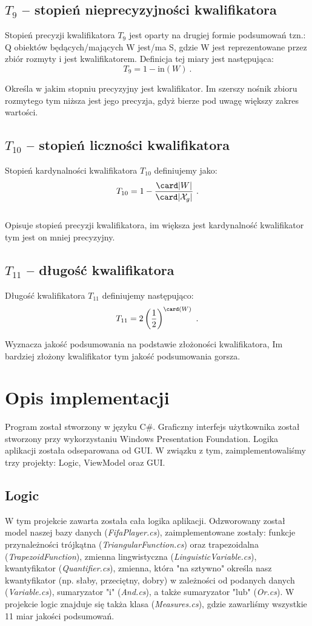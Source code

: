 \documentclass{classrep}
\begin{document}
\subsection{\(T_9\) -- stopień nieprecyzyjności kwalifikatora}
Stopień precyzji kwalifikatora \(T_9\) jest oparty na drugiej formie podsumowań tzn.: Q obiektów będących/mających W jest/ma S, gdzie W jest reprezentowane przez zbiór rozmyty i jest kwalifikatorem. Definicja tej miary jest następująca:
\[T_9 = 1-\mathrm{in}(W) ~\mbox{.}\]

Określa w jakim stopniu precyzyjny jest kwalifikator. Im szerszy nośnik zbioru rozmytego tym niższa jest jego precyzja, gdyż bierze pod uwagę większy zakres wartości. 


\subsection{\(T_{10}\) -- stopień liczności kwalifikatora}
Stopień kardynalności kwalifikatora \(T_{10}\) definiujemy jako:
\[T_{10} = 1-\frac{\card|W|}{\card|\mathcal{X}_g|} ~\mbox{.}\]\\

Opisuje stopień precyzji kwalifikatora, im większa jest kardynalność kwalifikator tym jest on mniej precyzyjny.

\subsection{\(T_{11}\) -- długość kwalifikatora}
Długość kwalifikatora \(T_{11}\) definiujemy następująco:
\[T_{11} = 2\left(\frac{1}{2}\right)^{\card({W})} ~\mbox{.}\]

Wyznacza jakość podsumowania na podstawie złożoności kwalifikatora, Im bardziej złożony kwalifikator tym jakość podsumowania gorsza.

\vspace\baselineskip

\section{Opis implementacji}
Program został stworzony w języku C\#. Graficzny interfejs użytkownika został stworzony przy  wykorzystaniu Windows Presentation Foundation. Logika aplikacji została odseparowana od GUI. W związku z tym, zaimplementowaliśmy trzy projekty: Logic, ViewModel oraz GUI.

\subsection{Logic}
W tym projekcie zawarta została cała logika aplikacji. Odzworowany został model naszej bazy danych (\emph{FifaPlayer.cs}), zaimplementowane zostały: funkcje przynależności trójkątna (\emph{TriangularFunction.cs}) oraz trapezoidalna (\emph{TrapezoidFunction}), zmienna lingwistyczna (\emph{LinguisticVariable.cs}), kwantyfikator (\emph{Quantifier.cs}), zmienna, która "na sztywno" określa nasz kwantyfikator (np. słaby, przeciętny, dobry) w zależności od podanych danych (\emph{Variable.cs}), sumaryzator "i" (\emph{And.cs}), a także sumaryzator "lub" (\emph{Or.cs}). W projekcie logic znajduje się takża klasa (\emph{Measures.cs}), gdzie zawarliśmy wszystkie 11 miar jakości podsumowań.
 
\end{document}
